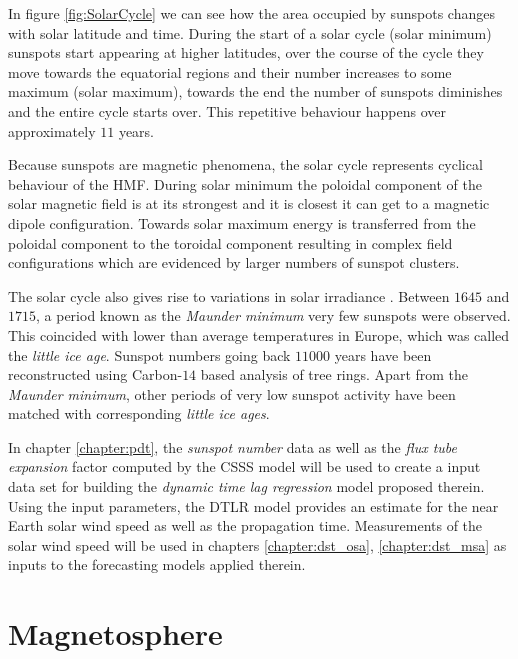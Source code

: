 In figure \ref{fig:SolarCycle} we can see how the area occupied by sunspots changes with solar latitude and time. 
During the start of a solar cycle (solar minimum) sunspots start appearing at higher latitudes, over the course 
of the cycle they move towards the equatorial regions and their number increases to some maximum (solar maximum), 
towards the end the number of sunspots diminishes and the entire cycle starts over. This repetitive behaviour 
happens over approximately $11$ years.

Because sunspots are magnetic phenomena, the solar cycle represents cyclical behaviour of the HMF. During solar 
minimum the poloidal component of the solar magnetic field is at its strongest and it is closest it can get to 
a magnetic dipole configuration. Towards solar maximum energy is transferred from the poloidal component to the 
toroidal component resulting in complex field configurations which are evidenced by larger numbers of sunspot 
clusters.

The solar cycle also gives rise to variations in solar irradiance \citep{solarirradiance}. Between $1645$ and 
$1715$, a period known as the \emph{Maunder minimum} very few sunspots were observed. This coincided with lower 
than average temperatures in Europe, which was called the \emph{little ice age}. Sunspot numbers going back $11000$ 
years have been reconstructed using Carbon-$14$ based analysis of tree rings. Apart from the \emph{Maunder minimum},
other periods of very low sunspot activity have been matched with corresponding \emph{little ice ages}.

In chapter \ref{chapter:pdt}, the \emph{sunspot number} data as well as the \emph{flux tube expansion} factor 
computed by the CSSS model will be used to create a input data set for building the \emph{dynamic time lag regression} 
model proposed therein. Using the input parameters, the DTLR model provides an estimate for the near Earth solar wind speed as 
well as the propagation time. Measurements of the solar wind speed will be used in chapters \ref{chapter:dst_osa}, 
\ref{chapter:dst_msa} as inputs to the forecasting models applied therein.


\section{Magnetosphere}\label{sec:mag}


